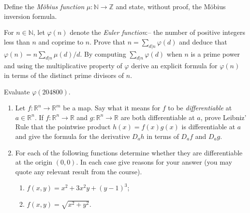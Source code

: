\documentclass{exams}
\newcommand{\R}{\mathbb{R}}
\newcommand{\N}{\mathbb{N}}
\newcommand{\Z}{\mathbb{Z}}
\begin{document}
\begin{exam}
\begin{question}
Define the {\it M\"obius function} $\mu \colon \N \to \Z$
and state, without proof, the M\"obius inversion formula.

For $n \in \N$, let $\varphi(n)$ denote the {\it Euler
function}:-- the number of positive integers less than $n$ and coprime
to $n$. Prove that $n= \displaystyle{\sum_{d\vert n}} \varphi(d)$ and
deduce that $\varphi(n) = n\displaystyle{\sum_{d\vert n}} \mu(d)/d$.
By computing $\displaystyle{\sum_{d\vert n}} \varphi(d)$ when $n$ is a
prime power and using the multiplicative property of $\varphi$ derive
an explicit formula for $\varphi(n)$ in terms of the distinct prime
divisors of $n$.

Evaluate $\varphi(204800)$.
\end{question}

\begin{question}
\begin{enumerate}
\item Let $f \colon \R^n \to \R^m$ be a map. Say what it means for $f$ to be
\textit{differentiable} at $a \in \R^n$. If $f \colon \R^n \to \R$ and
$g \colon \R^n \to \R$ are both differentiable at $a$, prove Leibniz'
Rule that the pointwise product $h(x) = f(x)g(x)$ is differentiable at
$a$ and give the formula for the derivative $D_ah$ in terms of $D_af$
and $D_ag$.

\item For each of the following functions determine whether they are
differentiable at the origin $(0,0)$. In each case give reasons for your
answer (you may quote any relevant result from the course).

\begin{enumerate}
\item $f(x,y) = x^2 + 3x^2y + (y-1)^3$;
\item $f(x,y) = \sqrt{x^2+y^2}$.
\end{enumerate}
\end{enumerate}
\end{question}

\end{exam}
\end{document}
